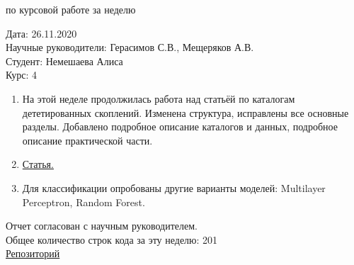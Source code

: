 \documentclass{article}
\begin{document}
\begin{center}{ по курсовой работе за неделю\\}\end{center}
Дата: 26.11.2020\\
Научные руководители: Герасимов С.В., Мещеряков А.В.\\
Студент: Немешаева Алиса\\
Курс: 4\\

\renewcommand{\labelitemi}{$\blacksquare$}
\renewcommand\labelitemii{$\square$}
\begin{enumerate}
    \item На этой неделе продолжилась работа над статьёй по каталогам дететированных скоплений. 
        Изменена структура, исправлены все основные разделы. Добавлено подробное описание каталогов 
        и данных, подробное описание практической части.\\
    \item \hyperlink{https://www.overleaf.com/read/zcgvtyscsyhv}{Статья.}\\
    \item Для классификации опробованы другие варианты моделей: Multilayer Perceptron, Random 
        Forest.\\ 
\end{enumerate}

Отчет согласован с научным руководителем.\\
Общее количество строк кода за эту неделю: 201\\
\hyperlink{https://github.com/rt2122/data-segmentation-2}{Репозиторий}\\ 
\end{document}
